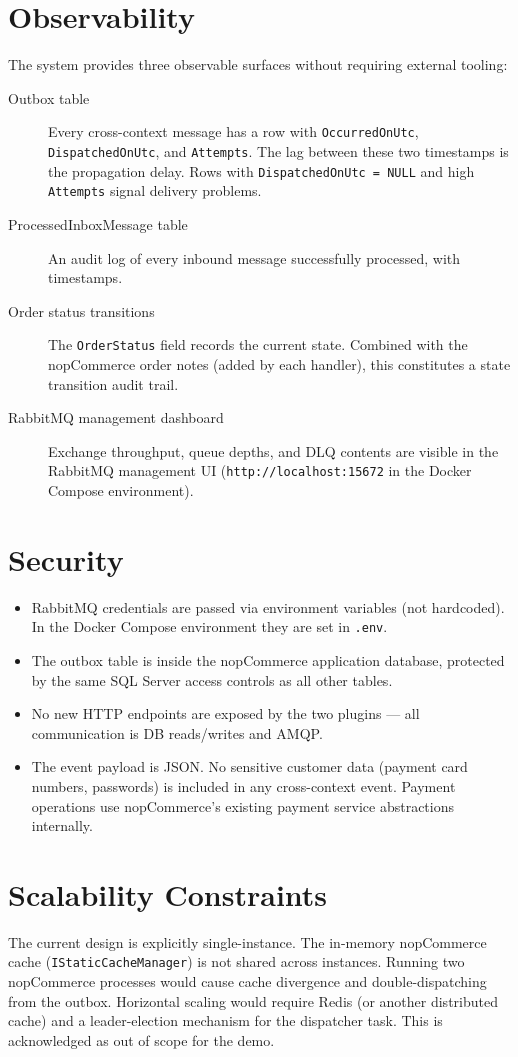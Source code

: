 \section{Observability}

The system provides three observable surfaces without requiring external tooling:

\begin{description}
    \item[Outbox table] Every cross-context message has a row with \texttt{OccurredOnUtc}, \texttt{DispatchedOnUtc}, and \texttt{Attempts}. The lag between these two timestamps is the propagation delay. Rows with \texttt{DispatchedOnUtc = NULL} and high \texttt{Attempts} signal delivery problems.
    \item[ProcessedInboxMessage table] An audit log of every inbound message successfully processed, with timestamps.
    \item[Order status transitions] The \texttt{OrderStatus} field records the current state. Combined with the nopCommerce order notes (added by each handler), this constitutes a state transition audit trail.
    \item[RabbitMQ management dashboard] Exchange throughput, queue depths, and DLQ contents are visible in the RabbitMQ management UI (\texttt{http://localhost:15672} in the Docker Compose environment).
\end{description}

\section{Security}

\begin{itemize}
    \item RabbitMQ credentials are passed via environment variables (not hardcoded). In the Docker Compose environment they are set in \texttt{.env}.
    \item The outbox table is inside the nopCommerce application database, protected by the same SQL Server access controls as all other tables.
    \item No new HTTP endpoints are exposed by the two plugins — all communication is DB reads/writes and AMQP.
    \item The event payload is JSON. No sensitive customer data (payment card numbers, passwords) is included in any cross-context event. Payment operations use nopCommerce's existing payment service abstractions internally.
\end{itemize}

\section{Scalability Constraints}

The current design is explicitly single-instance. The in-memory nopCommerce cache (\texttt{IStaticCacheManager}) is not shared across instances. Running two nopCommerce processes would cause cache divergence and double-dispatching from the outbox. Horizontal scaling would require Redis (or another distributed cache) and a leader-election mechanism for the dispatcher task. This is acknowledged as out of scope for the demo.


